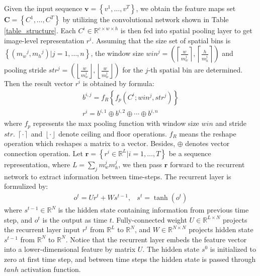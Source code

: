 \documentclass[10pt,twocolumn,letterpaper]{article}
\begin{document}
Given the input sequence $\mathbf{v} = \left\{ {{v^1}, \ldots ,{v^T}} \right\}$, we obtain the feature maps set $\mathbf{C} = \left\{ {{C^1}, \ldots ,{C^T}} \right\}$ by utilizing the convolutional network shown in Table \ref{table_structure}. Each ${C^i} \in {\mathbb{R}^{c \times w \times h}}$ is then fed into spatial pooling layer to get image-level representation ${r^i}$. Assuming that the size set of spatial bins is $\left\{ {({m_w}^j,{m_h}^j)|j = 1, \ldots ,n} \right\}$, the window size $wi{n^j} = \left( {\left\lceil {\frac{w}{{m_w^j}}} \right\rceil ,\left\lceil {\frac{h}{{m_h^j}}} \right\rceil } \right)$ and pooling stride $st{r^j} = \left( {\left\lfloor {\frac{w}{{m_w^j}}} \right\rfloor ,\left\lfloor {\frac{w}{{m_w^j}}} \right\rfloor } \right)$ for the $j$-th spatial bin are determined. Then the result vector ${r^i}$ is obtained by formula:
\begin{equation}
\begin{array}{*{20}{c}}
{{b^{i,j}} = {f_R}\left\{ {{f_p}\left( {{C^i};wi{n^j},st{r^j}} \right)} \right\}}\\
{{r^i} = {b^{i,1}} \oplus {b^{i,2}} \oplus  \cdots  \oplus {b^{i,n}}}
\end{array}
\end{equation}
where ${f_p}$ represents the max pooling function with window size $win$ and stride $str$. $\left\lceil  \cdot  \right\rceil $ and $\left\lfloor  \cdot  \right\rfloor $ denote ceiling and floor operations. ${f_R}$ means the reshape operation which reshapes a matrix to a vector. Besides, $ \oplus $ denotes vector connection operation. Let ${\mathbf{r}} = \left\{ {{r^i} \in {\mathbb{R}^L}|i = 1, \ldots ,T} \right\}$ be a sequence representation, where $L = \sum\limits_j {m_w^jm_h^j}$, we then pass $\mathbf{r}$ forward to the recurrent network to extract information between time-steps. The recurrent layer is formulized by:
\begin{equation}
\begin{array}{*{30}{c}}
  {{o^t} = U{r^t} + W{s^{t - 1}},}&{{s^t} = \operatorname{tanh} \left( {{o^t}} \right)} 
\end{array} 
\end{equation}
where ${s^{t - 1}} \in {\mathbb{R}^N}$ is the hidden state containing information from previous time step, and $o^t$ is the output as time $t$. Fully-connected weight $U \in {\mathbb{R}^{L \times N}}$ projects the recurrent layer input $r^t$ from ${{\mathbb{R}^L}}$ to ${{\mathbb{R}^N}}$, and $W \in {\mathbb{R}^{N \times N}}$ projects hidden state ${s^{t - 1}}$ from ${{\mathbb{R}^N}}$ to ${{\mathbb{R}^N}}$. Notice that the recurrent layer embeds the feature vector into a lower-dimensional feature by matrix $U$. The hidden state ${s^{0}}$ is initialized to zero at first time step, and between time steps the hidden state is passed through $tanh$ activation function.
\end{document}
